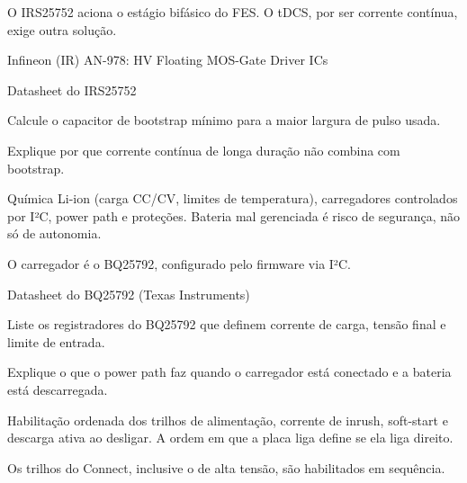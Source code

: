 \begin{noproduto}
O IRS25752 aciona o estágio bifásico do FES. O tDCS, por ser corrente contínua, exige outra solução.
\end{noproduto}

\begin{paraestudar}
  \item Infineon (IR) AN-978: HV Floating MOS-Gate Driver ICs
  \item Datasheet do IRS25752
\end{paraestudar}

\begin{pratique}
  \item Calcule o capacitor de bootstrap mínimo para a maior largura de pulso usada.
  \item Explique por que corrente contínua de longa duração não combina com bootstrap.
\end{pratique}

Química Li-ion (carga CC/CV, limites de temperatura), carregadores controlados por I²C, power path e proteções. Bateria mal gerenciada é risco de segurança, não só de autonomia.

\begin{noproduto}
O carregador é o BQ25792, configurado pelo firmware via I²C.
\end{noproduto}

\begin{paraestudar}
  \item {}
  \item Datasheet do BQ25792 (Texas Instruments)
\end{paraestudar}

\begin{pratique}
  \item Liste os registradores do BQ25792 que definem corrente de carga, tensão final e limite de entrada.
  \item Explique o que o power path faz quando o carregador está conectado e a bateria está descarregada.
\end{pratique}

Habilitação ordenada dos trilhos de alimentação, corrente de inrush, soft-start e descarga ativa ao desligar. A ordem em que a placa liga define se ela liga direito.

\begin{noproduto}
Os trilhos do Connect, inclusive o de alta tensão, são habilitados em sequência.
\end{noproduto}

